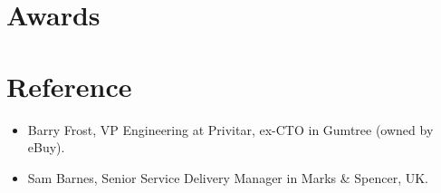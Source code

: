 \documentclass[a4paper]{twentysecondcv-english} %
\begin{document}
\section{Awards}

\begin{twentyshort} %
\end{twentyshort}

\section{Reference}
\begin{itemize}
    \item Barry Frost, VP Engineering at Privitar, ex-CTO in Gumtree (owned by eBuy).
    \item Sam Barnes, Senior Service Delivery Manager in Marks & Spencer, UK.
\end{itemize}
\end{document}
